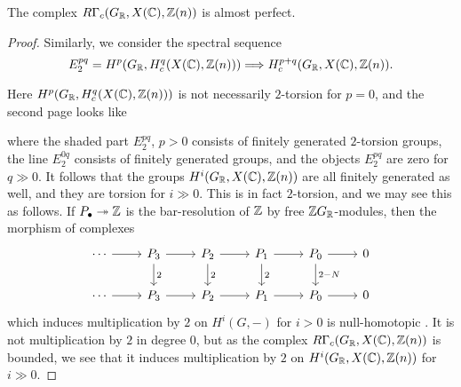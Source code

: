 \documentclass{article}
\numberwithin{equation}{section}
\begin{document}
\begin{lemma}
  \label{lemma:RGammac(GR,X(C),Z(n))-almost-perfect}
  The complex $R\Gamma_c (G_{\mathbb{R}}, X (\mathbb{C}), \mathbb{Z} (n))$
  is almost perfect.

  \begin{proof}
    Similarly, we consider the spectral sequence
    \[ E_2^{pq} = H^p (G_{\mathbb{R}}, H^q_c (X (\mathbb{C}), \mathbb{Z} (n)))
    \Longrightarrow
    H^{p+q}_c (G_{\mathbb{R}}, X (\mathbb{C}), \mathbb{Z} (n)). \]

    Here $H^p (G_{\mathbb{R}}, H^q_c (X (\mathbb{C}), \mathbb{Z} (n)))$ is not necessarily $2$-torsion
    for $p = 0$, and the second page looks like
    \begin{center}
    \end{center}
    where the shaded part $E_2^{pq}$, $p > 0$ consists of finitely generated
    $2$-torsion groups, the line $E_2^{0q}$ consists of finitely generated
    groups, and the objects $E_2^{pq}$ are zero for $q \gg 0$. It follows that
    the groups $H^i (G_{\mathbb{R}}, X (\mathbb{C}), \mathbb{Z} (n))$ are all finitely generated as
    well, and they are torsion for $i \gg 0$. This is in fact $2$-torsion, and
    we may see this as follows. If $P_\bullet \twoheadrightarrow \mathbb{Z}$ is the
    bar-resolution of $\mathbb{Z}$ by free $\mathbb{Z} G_{\mathbb{R}}$-modules, then the morphism of
    complexes
    \[ \begin{tikzcd}
      \cdots\ar{r} & P_3\ar{r}\ar{d}{2} & P_2\ar{r}\ar{d}{2} & P_1\ar{r}\ar{d}{2} & P_0\ar{r}\ar{d}{2-N} & 0 \\
      \cdots\ar{r} & P_3\ar{r} & P_2\ar{r} & P_1\ar{r} & P_0\ar{r} & 0
    \end{tikzcd} \]
    which induces multiplication by $2$ on $H^i (G,-)$ for $i > 0$
    is null-homotopic \cite[Theorem 6.5.8]{Weibel-1994}. It is not
    multiplication by $2$ in degree $0$, but as the complex
    $R\Gamma_c (G_{\mathbb{R}}, X (\mathbb{C}), \mathbb{Z} (n))$ is bounded, we see that it induces
    multiplication by $2$ on $H^i (G_{\mathbb{R}}, X (\mathbb{C}), \mathbb{Z} (n))$ for $i \gg 0$.
  \end{proof}
\end{lemma}
\end{document}
